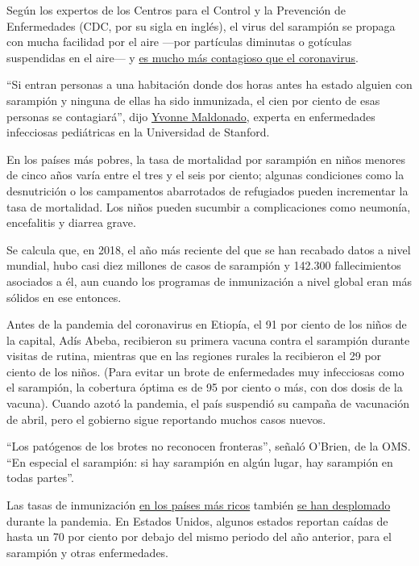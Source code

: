 Según los expertos de los Centros para el Control y la Prevención de
Enfermedades (CDC, por su sigla en inglés), el virus del sarampión se
propaga con mucha facilidad por el aire ---por partículas diminutas o
gotículas suspendidas en el aire--- y
\href{https://www.cdc.gov/measles/transmission.html}{es mucho más
contagioso que el coronavirus}.

``Si entran personas a una habitación donde dos horas antes ha estado
alguien con sarampión y ninguna de ellas ha sido inmunizada, el cien por
ciento de esas personas se contagiará'', dijo
\href{https://biox.stanford.edu/people/yvonne-maldonado}{Yvonne
Maldonado}, experta en enfermedades infecciosas pediátricas en la
Universidad de Stanford.

En los países más pobres, la tasa de mortalidad por sarampión en niños
menores de cinco años varía entre el tres y el seis por ciento; algunas
condiciones como la desnutrición o los campamentos abarrotados de
refugiados pueden incrementar la tasa de mortalidad. Los niños pueden
sucumbir a complicaciones como neumonía, encefalitis y diarrea grave.

Se calcula que, en 2018, el año más reciente del que se han recabado
datos a nivel mundial, hubo casi diez millones de casos de sarampión y
142.300 fallecimientos asociados a él, aun cuando los programas de
inmunización a nivel global eran más sólidos en ese entonces.

Antes de la pandemia del coronavirus en Etiopía, el 91 por ciento de los
niños de la capital, Adís Abeba, recibieron su primera vacuna contra el
sarampión durante visitas de rutina, mientras que en las regiones
rurales la recibieron el 29 por ciento de los niños. (Para evitar un
brote de enfermedades muy infecciosas como el sarampión, la cobertura
óptima es de 95 por ciento o más, con dos dosis de la vacuna). Cuando
azotó la pandemia, el país suspendió su campaña de vacunación de abril,
pero el gobierno sigue reportando muchos casos nuevos.

``Los patógenos de los brotes no reconocen fronteras'', señaló O'Brien,
de la OMS. ``En especial el sarampión: si hay sarampión en algún lugar,
hay sarampión en todas partes''.

Las tasas de inmunización
\href{https://www.nytimes3xbfgragh.onion/2020/05/20/nyregion/coronavirus-schools-vaccinations.html}{en
los países más ricos} también
\href{https://www.nytimes3xbfgragh.onion/2020/04/23/health/coronavirus-measles-vaccines.html}{se
han desplomado} durante la pandemia. En Estados Unidos, algunos estados
reportan caídas de hasta un 70 por ciento por debajo del mismo periodo
del año anterior, para el sarampión y otras enfermedades.

